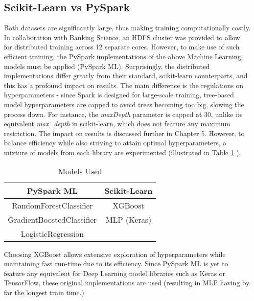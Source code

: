\documentclass[a4paper]{report}
\begin{document}
\subsection{Scikit-Learn vs PySpark}
Both datasets are significantly large, thus making training computationally costly. In collaboration with Banking Science, an HDFS cluster was provided 
to allow for distributed training across 12 separate cores. However, to make use of such efficient training, the PySpark implementations of the above Machine Learning models 
must be applied (PySpark ML). Surprisingly, the distributed implementations differ greatly from their standard, scikit-learn counterparts, and this has a profound 
impact on results. The main difference is the regulations on hyperparameters - since Spark is designed for large-scale training, tree-based model hyperparameters 
are capped to avoid trees becoming too big, slowing the process down. For instance, the \textit{maxDepth} parameter is capped at 30, unlike its equivalent \textit{max\_depth} 
in scikit-learn, which does not feature any maximum restriction. The impact on results is discussed further in Chapter 5. However, to balance efficiency while 
also striving to attain optimal hyperparameters, a mixture of models from each library are experimented (illustrated in Table \ref{tab:models_libraries} ).
\begin{table}[htbp]
  \centering
  \begin{tabular}{|c|c|}
  \hline
  \textbf{PySpark ML} & \textbf{Scikit-Learn} \\
  \hline
  RandomForestClassifier & XGBoost \\
  GradientBoostedClassifier & MLP (Keras) \\
  LogisticRegression &  \\
  \hline
  \end{tabular}
  \caption{Models Used}
  \label{tab:models_libraries}
\end{table}
Choosing XGBoost allows extensive exploration of hyperparameters while maintaining fast run-time due to its efficiency. Since PySpark ML is yet to feature 
any equivalent for Deep Learning model libraries such as Keras or TensorFlow, these original implementations are used (resulting in MLP having by far the longest
train time.)
\end{document}
